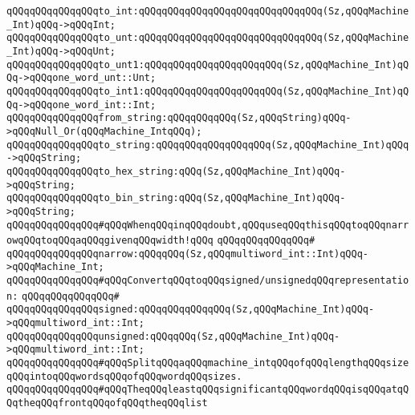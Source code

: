 \newline
\verb|qQQqqQQqqQQqqQQqto_int:qQQqqQQqqQQqqQQqqQQqqQQqqQQqqQQq(Sz,qQQqMachine_Int)qQQq->qQQqInt;|\newline
\verb|qQQqqQQqqQQqqQQqto_unt:qQQqqQQqqQQqqQQqqQQqqQQqqQQqqQQq(Sz,qQQqMachine_Int)qQQq->qQQqUnt;|\newline
\verb|qQQqqQQqqQQqqQQqto_unt1:qQQqqQQqqQQqqQQqqQQqqQQq(Sz,qQQqMachine_Int)qQQq->qQQqone_word_unt::Unt;|\newline
\verb|qQQqqQQqqQQqqQQqto_int1:qQQqqQQqqQQqqQQqqQQqqQQq(Sz,qQQqMachine_Int)qQQq->qQQqone_word_int::Int;|\newline
\newline
\verb|qQQqqQQqqQQqqQQqfrom_string:qQQqqQQqqQQq(Sz,qQQqString)qQQq->qQQqNull_Or(qQQqMachine_IntqQQq);|\newline
\verb|qQQqqQQqqQQqqQQqto_string:qQQqqQQqqQQqqQQqqQQq(Sz,qQQqMachine_Int)qQQq->qQQqString;|\newline
\verb|qQQqqQQqqQQqqQQqto_hex_string:qQQq(Sz,qQQqMachine_Int)qQQq->qQQqString;|\newline
\verb|qQQqqQQqqQQqqQQqto_bin_string:qQQq(Sz,qQQqMachine_Int)qQQq->qQQqString;|\newline
\newline
\newline
\verb|qQQqqQQqqQQqqQQq#qQQqWhenqQQqinqQQqdoubt,qQQquseqQQqthisqQQqtoqQQqnarrowqQQqtoqQQqaqQQqgivenqQQqwidth!qQQq|\newline
\verb|qQQqqQQqqQQqqQQq#|\newline
\verb|qQQqqQQqqQQqqQQqnarrow:qQQqqQQq(Sz,qQQqmultiword_int::Int)qQQq->qQQqMachine_Int;|\newline
\newline
\verb|qQQqqQQqqQQqqQQq#qQQqConvertqQQqtoqQQqsigned/unsignedqQQqrepresentation:|\newline
\verb|qQQqqQQqqQQqqQQq#|\newline
\verb|qQQqqQQqqQQqqQQqsigned:qQQqqQQqqQQqqQQq(Sz,qQQqMachine_Int)qQQq->qQQqmultiword_int::Int;|\newline
\verb|qQQqqQQqqQQqqQQqunsigned:qQQqqQQq(Sz,qQQqMachine_Int)qQQq->qQQqmultiword_int::Int;|\newline
\newline
\verb|qQQqqQQqqQQqqQQq#qQQqSplitqQQqaqQQqmachine_intqQQqofqQQqlengthqQQqsizeqQQqintoqQQqwordsqQQqofqQQqwordqQQqsizes.|\newline
\verb|qQQqqQQqqQQqqQQq#qQQqTheqQQqleastqQQqsignificantqQQqwordqQQqisqQQqatqQQqtheqQQqfrontqQQqofqQQqtheqQQqlist|\newline
